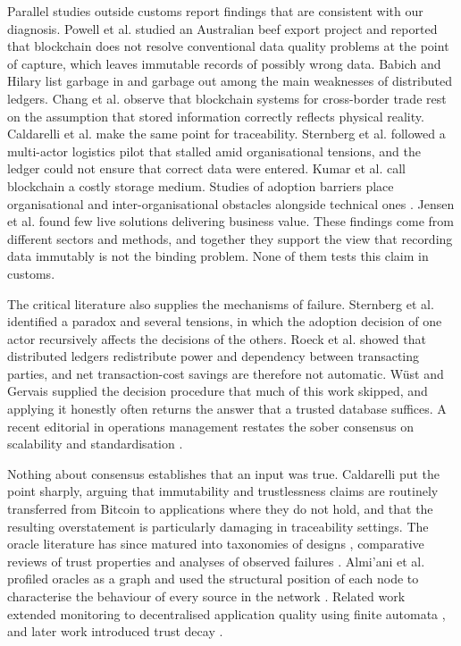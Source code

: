 \documentclass[information,article,submit,moreauthors]{Definitions/mdpi}
\begin{document}
Parallel studies outside customs report findings that are consistent with our diagnosis. Powell et al. \cite{powell2022garbage} studied an Australian beef export project and reported that blockchain does not resolve conventional data quality problems at the point of capture, which leaves immutable records of possibly wrong data. Babich and Hilary \cite{babich2020distributed} list garbage in and garbage out among the main weaknesses of distributed ledgers. Chang et al. \cite{chang2020blockchain} observe that blockchain systems for cross-border trade rest on the assumption that stored information correctly reflects physical reality. Caldarelli et al. \cite{caldarelli2020overcoming} make the same point for traceability. Sternberg et al. \cite{sternberg2021struggle} followed a multi-actor logistics pilot that stalled amid organisational tensions, and the ledger could not ensure that correct data were entered. Kumar et al. \cite{kumar2020silver} call blockchain a costly storage medium. Studies of adoption barriers place organisational and inter-organisational obstacles alongside technical ones \cite{saberi2019blockchain,kouhizadeh2021blockchain,hastig2020blockchain}. Jensen et al. \cite{jensen2019tradelens} found few live solutions delivering business value. These findings come from different sectors and methods, and together they support the view that recording data immutably is not the binding problem. None of them tests this claim in customs.

The critical literature also supplies the mechanisms of failure. Sternberg et al. \cite{sternberg2021struggle} identified a paradox and several tensions, in which the adoption decision of one actor recursively affects the decisions of the others. Roeck et al. \cite{roeck2020transaction} showed that distributed ledgers redistribute power and dependency between transacting parties, and net transaction-cost savings are therefore not automatic. W\"ust and Gervais \cite{wust2018needblockchain} supplied the decision procedure that much of this work skipped, and applying it honestly often returns the answer that a trusted database suffices. A recent editorial in operations management restates the sober consensus on scalability and standardisation \cite{lumineau2025charting}.

Nothing about consensus establishes that an input was true. Caldarelli \cite{caldarelli2020oracle} put the point sharply, arguing that immutability and trustlessness claims are routinely transferred from Bitcoin to applications where they do not hold, and that the resulting overstatement is particularly damaging in traceability settings. The oracle literature has since matured into taxonomies of designs \cite{pasdar2023oraclesurvey}, comparative reviews of trust properties \cite{albreiki2020oracles} and analyses of observed failures \cite{caldarelli2021defi}. Almi'ani et al. profiled oracles as a graph and used the structural position of each node to characterise the behaviour of every source in the network \cite{almiani2023oracles}. Related work extended monitoring to decentralised application quality using finite automata \cite{alrawashdeh2024dfa}, and later work introduced trust decay \cite{ababneh2026trustdecay}.
\end{document}
